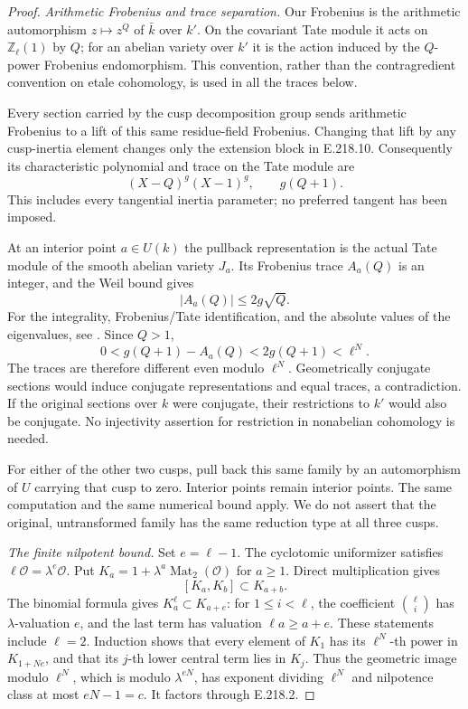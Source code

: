 \begin{proof}
\emph{Arithmetic Frobenius and trace separation.}
Our Frobenius is the arithmetic automorphism $z\mapsto z^Q$ of $\bar k$
over $k'$. On the covariant Tate module it acts on $\mathbb Z_\ell(1)$ by
$Q$; for an abelian variety over $k'$ it is the action induced by the
$Q$-power Frobenius endomorphism. This convention, rather than the
contragredient convention on etale cohomology, is used in all the traces
below.

Every section carried by the cusp decomposition group sends arithmetic
Frobenius to a lift of this same residue-field Frobenius. Changing that
lift by any cusp-inertia element changes only the extension block in
E.218.10. Consequently its characteristic polynomial and trace on the
Tate module are
\[
 (X-Q)^g(X-1)^g,\qquad g(Q+1).
 \tag{E.218.11}
\]
This includes every tangential inertia parameter; no preferred tangent
has been imposed.

At an interior point $a\in U(k)$ the pullback representation is the actual
Tate module of the smooth abelian variety $J_a$. Its Frobenius trace
$A_a(Q)$ is an integer, and the Weil bound gives
\[
 |A_a(Q)|\le2g\sqrt Q.
 \tag{E.218.12}
\]
For the integrality, Frobenius/Tate identification, and the absolute
values of the eigenvalues, see \citet[Chapter~II, Theorem~1.1(b), printed
pp.~75--78]{AuditMilneAV2008}. Since $Q>1$,
\[
 0<g(Q+1)-A_a(Q)<2g(Q+1)<\ell^N.
 \tag{E.218.13}
\]
The traces are therefore different even modulo $\ell^N$. Geometrically
conjugate sections would induce conjugate representations and equal
traces, a contradiction. If the original sections over $k$ were conjugate,
their restrictions to $k'$ would also be conjugate. No injectivity assertion
for restriction in nonabelian cohomology is needed.

For either of the other two cusps, pull back this same family by an
automorphism of $U$ carrying that cusp to zero. Interior points remain
interior points. The same computation and the same numerical bound
apply. We do not assert that the original, untransformed family has the
same reduction type at all three cusps.

\emph{The finite nilpotent bound.}
Set $e=\ell-1$. The cyclotomic uniformizer satisfies
$\ell\mathcal O=\lambda^e\mathcal O$. Put
$K_a=1+\lambda^a\operatorname{Mat}_2(\mathcal O)$ for $a\ge1$.
Direct multiplication gives
\[
 [K_a,K_b]\subset K_{a+b}.
 \tag{E.218.14}
\]
The binomial formula gives $K_a^\ell\subset K_{a+e}$: for $1\le i<\ell$,
the coefficient $\binom\ell i$ has $\lambda$-valuation $e$, and the last
term has valuation $\ell a\ge a+e$. These statements include $\ell=2$.
Induction shows that every element of $K_1$ has its $\ell^N$-th power in
$K_{1+Ne}$, and that its $j$-th lower central term lies in $K_j$. Thus the
geometric image modulo $\ell^N$, which is modulo $\lambda^{eN}$, has
exponent dividing $\ell^N$ and nilpotence class at most $eN-1=c$.
It factors through E.218.2.


\end{proof}
